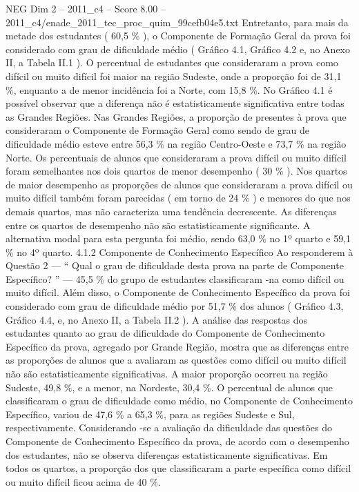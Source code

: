 \begin{textsample}{NEG Dim 2 – 2011\_c4 – Score 8.00 – 2011\_c4/enade\_2011\_tec\_proc\_quim\_99cefb04e5.txt}
Entretanto, para mais da metade dos estudantes ( 60,5 \% ), o Componente de Formação Geral da prova foi considerado com grau de dificuldade médio ( Gráfico 4.1, Gráfico 4.2 e, no Anexo II, a Tabela II.1 ).
O percentual de estudantes que consideraram a prova como difícil ou muito difícil foi maior na região Sudeste, onde a proporção foi de 31,1 \%, enquanto a de menor incidência foi a Norte, com 15,8 \%.
No Gráfico 4.1 é possível observar que a diferença não é estatisticamente significativa entre todas as Grandes Regiões.
Nas Grandes Regiões, a proporção de presentes à prova que consideraram o Componente de Formação Geral como sendo de grau de dificuldade médio esteve entre 56,3 \% na região Centro-Oeste e 73,7 \% na região Norte.
Os percentuais de alunos que consideraram a prova difícil ou muito difícil foram semelhantes nos dois quartos de menor desempenho ( 30 \% ).
Nos quartos de maior desempenho as proporções de alunos que consideraram a prova difícil ou muito difícil também foram parecidas ( em torno de 24 \% ) e menores do que nos demais quartos, mas não caracteriza uma tendência decrescente.
As diferenças entre os quartos de desempenho não são estatisticamente significante.
A alternativa modal para esta pergunta foi médio, sendo 63,0 \% no 1º quarto e 59,1 \% no 4º quarto. 4.1.2 Componente de Conhecimento Específico Ao responderem à Questão 2 — “ Qual o grau de dificuldade desta prova na parte de Componente Específico? ” — 45,5 \% do grupo de estudantes classificaram -na como difícil ou muito difícil.
Além disso, o Componente de Conhecimento Específico da prova foi considerado com grau de dificuldade médio por 51,7 \% dos alunos ( Gráfico 4.3, Gráfico 4.4, e, no Anexo II, a Tabela II.2 ).
A análise das respostas dos estudantes quanto ao grau de dificuldade do Componente de Conhecimento Específico da prova, agregado por Grande Região, mostra que as diferenças entre as proporções de alunos que a avaliaram as questões como difícil ou muito difícil não são estatisticamente significativas.
A maior proporção ocorreu na região Sudeste, 49,8 \%, e a menor, na Nordeste, 30,4 \%.
O percentual de alunos que classificaram o grau de dificuldade como médio, no Componente de Conhecimento Específico, variou de 47,6 \% a 65,3 \%, para as regiões Sudeste e Sul, respectivamente.
Considerando -se a avaliação da dificuldade das questões do Componente de Conhecimento Específico da prova, de acordo com o desempenho dos estudantes, não se observa diferenças estatisticamente significativas.
Em todos os quartos, a proporção dos que classificaram a parte específica como difícil ou muito difícil ficou acima de 40 \%.

\end{textsample}
